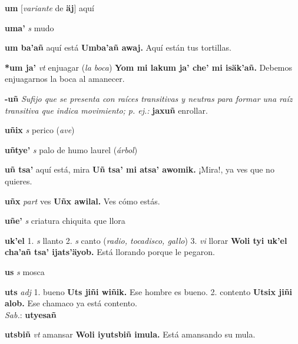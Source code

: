 \documentclass[10pt]{scrbook}
\newcommand{\entry}[1]{\textbf{#1}}
\newcommand{\onedefinition}[1]{#1.}
\newcommand{\nontranslationdef}[1]{\textit{#1}}
\newcommand{\partofspeech}[1]{\textit{#1}}
\newcommand{\spanishtranslation}[1]{#1}
\newcommand{\clarification}[1]{(\textit{#1})}
\newcommand{\cholexample}[1]{\textbf{#1}}
\newcommand{\exampletranslation}[1]{#1}
\newcommand{\dialectvariant}[1]{\\\textit{#1}:}
\newcommand{\dialectword}[1]{\textbf{#1}}
\newcommand{\conjugationtense}[1]{[\textit{#1}}
\newcommand{\conjugationverb}[1]{de \textbf{#1}]}
\begin{document}
\begin{multicols}{2}
\entry{um}
\conjugationtense{variante}
\conjugationverb{äj}
\spanishtranslation{aquí}

\entry{uma'}
\partofspeech{s}
\spanishtranslation{mudo}

\entry{um ba'añ}
\spanishtranslation{aquí está}
\cholexample{Umba'añ awaj.}
\exampletranslation{Aquí están tus tortillas.}

\entry{*um ja'}
\partofspeech{vt}
\spanishtranslation{enjuagar}
\clarification{la boca}
\cholexample{Yom mi lakum ja' che' mi isäk'añ.}
\exampletranslation{Debemos enjuagarnos la boca al amanecer.}

\entry{-uñ}
\nontranslationdef{Sufijo que se presenta con raíces transitivas y neutras para formar una raíz transitiva que indica movimiento; p. ej.:}
\cholexample{jaxuñ}
\exampletranslation{enrollar.}

\entry{uñix}
\partofspeech{s}
\spanishtranslation{perico}
\clarification{ave}

\entry{uñtye'}
\partofspeech{s}
\spanishtranslation{palo de humo}
\spanishtranslation{laurel}
\clarification{árbol}

\entry{uñ tsa'}
\spanishtranslation{aquí está, mira}
\cholexample{Uñ tsa' mi atsa' awomik.}
\exampletranslation{¡Mira!, ya ves que no quieres.}

\entry{uñx}
\partofspeech{part}
\spanishtranslation{ves}
\cholexample{Uñx awilal.}
\exampletranslation{Ves cómo estás.}

\entry{uñe'}
\partofspeech{s}
\spanishtranslation{criatura chiquita que llora}

\entry{uk'el}
\onedefinition{1}
\partofspeech{s}
\spanishtranslation{llanto}
\onedefinition{2}
\partofspeech{s}
\spanishtranslation{canto}
\clarification{radio, tocadisco, gallo}
\onedefinition{3}
\partofspeech{vi}
\spanishtranslation{llorar}
\cholexample{Woli tyi uk'el cha'añ tsa' ijats'äyob.}
\exampletranslation{Está llorando porque le pegaron.}

\entry{us}
\partofspeech{s}
\spanishtranslation{mosca}

\entry{uts}
\partofspeech{adj}
\onedefinition{1}
\spanishtranslation{bueno}
\cholexample{Uts jiñi wiñik.}
\exampletranslation{Ese hombre es bueno.}
\onedefinition{2}
\spanishtranslation{contento}
\cholexample{Utsix jiñi alob.}
\exampletranslation{Ese chamaco ya está contento.}
\dialectvariant{Sab.}
\dialectword{utyesañ}

\entry{utsbiñ}
\partofspeech{vt}
\spanishtranslation{amansar}
\cholexample{Woli iyutsbiñ imula.}
\exampletranslation{Está amansando su mula.}


\end{multicols}
\end{document}
